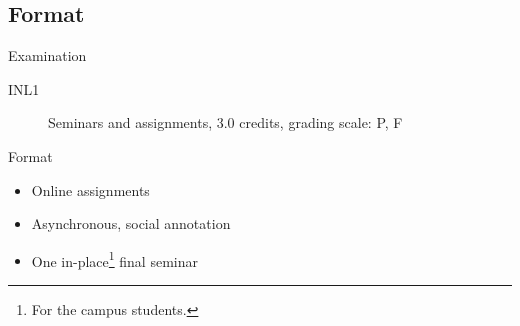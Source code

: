 %
%
%
%

\subsection{Format}

\begin{frame}[fragile]
  \begin{block}{Examination}
    \begin{description}
      \item[INL1] Seminars and assignments, 3.0 credits, grading scale: P, F
    \end{description}
  \end{block}

  \pause

  \begin{block}{Format}
    \begin{itemize}
      \item Online assignments
      \item Asynchronous, social annotation
      \item One in-place\footnote{%
          For the campus students.
        } final seminar
    \end{itemize}
  \end{block}
\end{frame}

